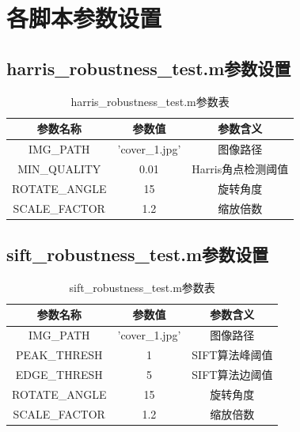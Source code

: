 \documentclass[a4paper, UTF8]{ctexrep}
\begin{document}
  \section{各脚本参数设置}
    \subsection{harris\_robustness\_test.m参数设置}
      \begin{table}[htbp!]
        \centering
        \begin{tabular}{ccc}
        \hline
        参数名称 & 参数值 & 参数含义 \\
        \hline
        IMG\_PATH & 'cover\_1.jpg' & 图像路径 \\
        MIN\_QUALITY & 0.01 & Harris角点检测阈值 \\
        ROTATE\_ANGLE & 15 & 旋转角度 \\
        SCALE\_FACTOR & 1.2 & 缩放倍数 \\
        \hline
        \end{tabular}
        \caption{harris\_robustness\_test.m参数表}
      \end{table}

    \subsection{sift\_robustness\_test.m参数设置}
    \clearpage
      \begin{table}[htbp!]
        \centering
        \begin{tabular}{ccc}
        \hline
        参数名称 & 参数值 & 参数含义 \\
        \hline
        IMG\_PATH & 'cover\_1.jpg' & 图像路径 \\
        PEAK\_THRESH & 1 & SIFT算法峰阈值 \\
        EDGE\_THRESH & 5 & SIFT算法边阈值 \\
        ROTATE\_ANGLE & 15 & 旋转角度 \\
        SCALE\_FACTOR & 1.2 & 缩放倍数 \\
        \hline
        \end{tabular}
        \caption{sift\_robustness\_test.m参数表}
      \end{table}
\end{document}
